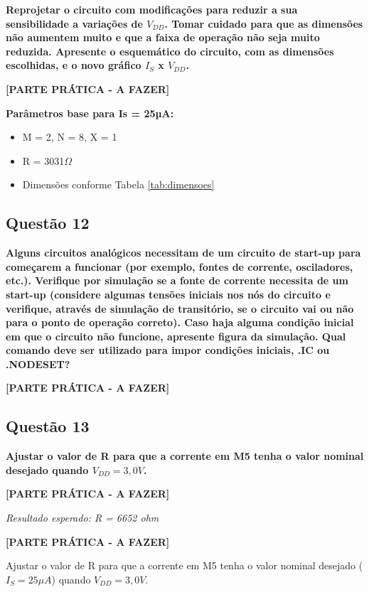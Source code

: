 \documentclass[12pt,a4paper]{article}
\begin{document}
\textbf{Reprojetar o circuito com modificações para reduzir a sua sensibilidade a variações de $V_{DD}$. Tomar cuidado para que as dimensões não aumentem muito e que a faixa de operação não seja muito reduzida. Apresente o esquemático do circuito, com as dimensões escolhidas, e o novo gráfico $I_S$ x $V_{DD}$.}

\textbf{[PARTE PRÁTICA - A FAZER]}

\textbf{Parâmetros base para Is = 25µA:}
\begin{itemize}
    \item M = 2, N = 8, X = 1
    \item R = 3031$\Omega$
    \item Dimensões conforme Tabela \ref{tab:dimensoes}
\end{itemize}

\subsection*{Questão 12}

\textbf{Alguns circuitos analógicos necessitam de um circuito de start-up para começarem a funcionar (por exemplo, fontes de corrente, osciladores, etc.). Verifique por simulação se a fonte de corrente necessita de um start-up (considere algumas tensões iniciais nos nós do circuito e verifique, através de simulação de transitório, se o circuito vai ou não para o ponto de operação correto). Caso haja alguma condição inicial em que o circuito não funcione, apresente figura da simulação. Qual comando deve ser utilizado para impor condições iniciais, .IC ou .NODESET?}

\textbf{[PARTE PRÁTICA - A FAZER]}

\subsection*{Questão 13}

\textbf{Ajustar o valor de R para que a corrente em M5 tenha o valor nominal desejado quando $V_{DD} = 3,0V$.}

\textbf{[PARTE PRÁTICA - A FAZER]}

\textit{Resultado esperado: R = 6652 ohm}

\textbf{[PARTE PRÁTICA - A FAZER]}

Ajustar o valor de R para que a corrente em M5 tenha o valor nominal desejado ($I_S = 25 \mu A$) quando $V_{DD} = 3,0V$.
\end{document}
